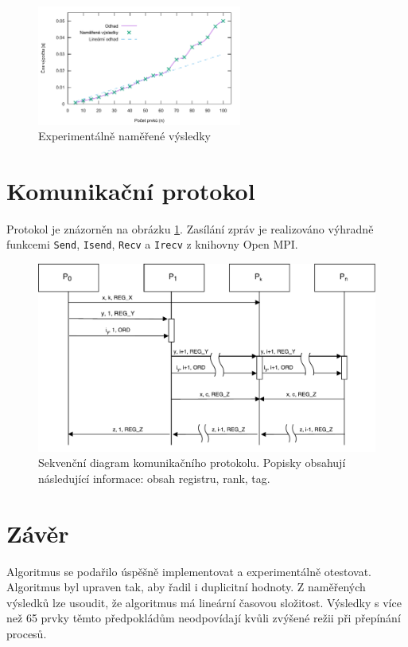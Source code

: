 \documentclass[11pt,a4paper]{article}
\begin{document}
\begin{figure}[!ht]
    \centering
		\includegraphics[width=0.6\textwidth]{results}
    \caption{Experimentálně naměřené výsledky}
\end{figure}

\section{Komunikační protokol}
\label{proto}

Protokol je znázorněn na obrázku \ref{proto_schema}. Zasílání zpráv je realizováno výhradně funkcemi \texttt{Send}, \texttt{Isend}, \texttt{Recv} a \texttt{Irecv} z knihovny Open MPI.

\begin{figure}[!h]
    \includegraphics[width=0.8\linewidth]{protokol}
    \centering
    \caption{Sekvenční diagram komunikačního protokolu. Popisky obsahují následující informace: obsah registru, rank, tag.}
    \label{proto_schema}
\end{figure}


\section{Závěr}

Algoritmus se podařilo úspěšně implementovat a experimentálně otestovat. Algoritmus byl upraven tak, aby řadil i duplicitní hodnoty. Z naměřených výsledků lze usoudit, že algoritmus má lineární časovou složitost. Výsledky s více než 65 prvky těmto předpokládům neodpovídají kvůli zvýšené režii při přepínání procesů.




\makeatletter
\makeatother

\end{document}
